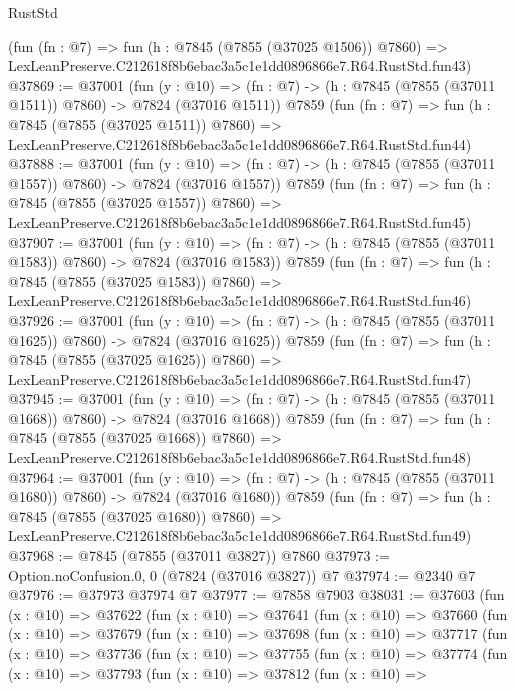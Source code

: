 \begin{lexlean}{RustStd}
\begin{coremodule}
    (fun (fn : @7) =>
    fun (h : @7845 (@7855 (@37025 @1506)) @7860) =>
    LexLeanPreserve.C212618f8b6ebac3a5c1e1dd0896866e7.R64.RustStd.fun43)
@37869 := @37001
    (fun (y : @10) => (fn : @7) -> (h : @7845 (@7855 (@37011 @1511)) @7860) -> @7824 (@37016 @1511))
    @7859
    (fun (fn : @7) =>
    fun (h : @7845 (@7855 (@37025 @1511)) @7860) =>
    LexLeanPreserve.C212618f8b6ebac3a5c1e1dd0896866e7.R64.RustStd.fun44)
@37888 := @37001
    (fun (y : @10) => (fn : @7) -> (h : @7845 (@7855 (@37011 @1557)) @7860) -> @7824 (@37016 @1557))
    @7859
    (fun (fn : @7) =>
    fun (h : @7845 (@7855 (@37025 @1557)) @7860) =>
    LexLeanPreserve.C212618f8b6ebac3a5c1e1dd0896866e7.R64.RustStd.fun45)
@37907 := @37001
    (fun (y : @10) => (fn : @7) -> (h : @7845 (@7855 (@37011 @1583)) @7860) -> @7824 (@37016 @1583))
    @7859
    (fun (fn : @7) =>
    fun (h : @7845 (@7855 (@37025 @1583)) @7860) =>
    LexLeanPreserve.C212618f8b6ebac3a5c1e1dd0896866e7.R64.RustStd.fun46)
@37926 := @37001
    (fun (y : @10) => (fn : @7) -> (h : @7845 (@7855 (@37011 @1625)) @7860) -> @7824 (@37016 @1625))
    @7859
    (fun (fn : @7) =>
    fun (h : @7845 (@7855 (@37025 @1625)) @7860) =>
    LexLeanPreserve.C212618f8b6ebac3a5c1e1dd0896866e7.R64.RustStd.fun47)
@37945 := @37001
    (fun (y : @10) => (fn : @7) -> (h : @7845 (@7855 (@37011 @1668)) @7860) -> @7824 (@37016 @1668))
    @7859
    (fun (fn : @7) =>
    fun (h : @7845 (@7855 (@37025 @1668)) @7860) =>
    LexLeanPreserve.C212618f8b6ebac3a5c1e1dd0896866e7.R64.RustStd.fun48)
@37964 := @37001
    (fun (y : @10) => (fn : @7) -> (h : @7845 (@7855 (@37011 @1680)) @7860) -> @7824 (@37016 @1680))
    @7859
    (fun (fn : @7) =>
    fun (h : @7845 (@7855 (@37025 @1680)) @7860) =>
    LexLeanPreserve.C212618f8b6ebac3a5c1e1dd0896866e7.R64.RustStd.fun49)
@37968 := @7845 (@7855 (@37011 @3827)) @7860
@37973 := Option.noConfusion.{0, 0} (@7824 (@37016 @3827)) @7
@37974 := @2340 @7
@37976 := @37973 @37974 @7
@37977 := @7858 @7903
@38031 := @37603
    (fun (x : @10) =>
    @37622
      (fun (x : @10) =>
      @37641
        (fun (x : @10) =>
        @37660
          (fun (x : @10) =>
          @37679
            (fun (x : @10) =>
            @37698
              (fun (x : @10) =>
              @37717
                (fun (x : @10) =>
                @37736
                  (fun (x : @10) =>
                  @37755
                    (fun (x : @10) =>
                    @37774
                      (fun (x : @10) =>
                      @37793
                        (fun (x : @10) =>
                        @37812
                          (fun (x : @10) =>

\end{coremodule}
\end{lexlean}

